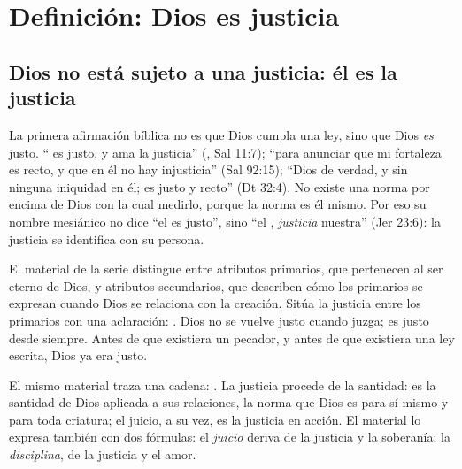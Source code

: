 \section{Definición: Dios es justicia}\label{sec:definicion-justo}

\subsection{Dios no está sujeto a una justicia: él es la justicia}
La primera afirmación bíblica no es que Dios cumpla una ley, sino que Dios \emph{es} justo. ``\SENOR{} es justo, y ama la justicia'' (, Sal 11:7); ``para anunciar que \SENOR{} mi fortaleza es recto, y que en él no hay injusticia'' (Sal 92:15); ``Dios de verdad, y sin ninguna iniquidad en él; es justo y recto'' (Dt 32:4). No existe una norma por encima de Dios con la cual medirlo, porque la norma es él mismo. Por eso su nombre mesiánico no dice ``el \SENOR{} es justo'', sino ``el \SENOR, \emph{justicia} nuestra'' (Jer 23:6): la justicia se identifica con su persona.

El material de la serie distingue entre atributos primarios, que pertenecen al ser eterno de Dios, y atributos secundarios, que describen cómo los primarios se expresan cuando Dios se relaciona con la creación. Sitúa la justicia entre los primarios con una aclaración: . Dios no se vuelve justo cuando juzga; es justo desde siempre. Antes de que existiera un pecador, y antes de que existiera una ley escrita, Dios ya era justo.

El mismo material traza una cadena: . La justicia procede de la santidad: es la santidad de Dios aplicada a sus relaciones, la norma que Dios es para sí mismo y para toda criatura; el juicio, a su vez, es la justicia en acción. El material lo expresa también con dos fórmulas: el \emph{juicio} deriva de la justicia y la soberanía; la \emph{disciplina}, de la justicia y el amor.


